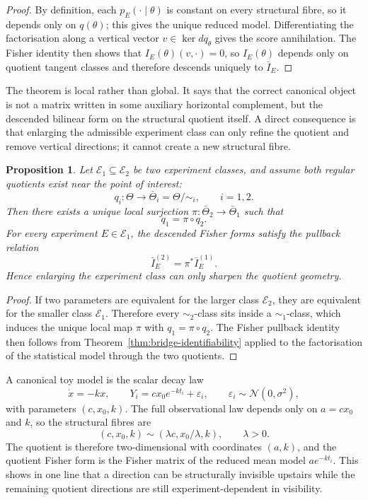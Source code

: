 \documentclass[11pt]{article}
\numberwithin{equation}{section}
\theoremstyle{thmcompact}
\newtheorem{proposition}[theorem]{Proposition}
\theoremstyle{remark}
\begin{document}
\begin{proof}
By definition, each $p_E(\cdot\mid\theta)$ is constant on every structural fibre, so it depends only on $q(\theta)$; this gives the unique reduced model. Differentiating the factorisation along a vertical vector $v\in\ker dq_\theta$ gives the score annihilation. The Fisher identity then shows that $I_E(\theta)(v,\cdot)=0$, so $I_E(\theta)$ depends only on quotient tangent classes and therefore descends uniquely to $\bar I_E$.
\end{proof}

The theorem is local rather than global. It says that the correct canonical object is not a matrix written in some auxiliary horizontal complement, but the descended bilinear form on the structural quotient itself. A direct consequence is that enlarging the admissible experiment class can only refine the quotient and remove vertical directions; it cannot create a new structural fibre.

\begin{proposition}\label{prop:bridge-identifiability-refinement}
Let $\mathcal E_1\subseteq \mathcal E_2$ be two experiment classes, and assume both regular quotients exist near the point of interest:
\[
q_i:\Theta\to \bar\Theta_i=\Theta/\!\sim_i,\qquad i=1,2.
\]
Then there exists a unique local surjection $\pi:\bar\Theta_2\to \bar\Theta_1$ such that
\[
q_1=\pi\circ q_2.
\]
For every experiment $E\in\mathcal E_1$, the descended Fisher forms satisfy the pullback relation
\[
\bar I_E^{(2)}=\pi^*\bar I_E^{(1)}.
\]
Hence enlarging the experiment class can only sharpen the quotient geometry.
\end{proposition}

\begin{proof}
If two parameters are equivalent for the larger class $\mathcal E_2$, they are equivalent for the smaller class $\mathcal E_1$. Therefore every $\sim_2$-class sits inside a $\sim_1$-class, which induces the unique local map $\pi$ with $q_1=\pi\circ q_2$. The Fisher pullback identity then follows from Theorem~\ref{thm:bridge-identifiability} applied to the factorisation of the statistical model through the two quotients.
\end{proof}

A canonical toy model is the scalar decay law
\[
\dot x=-k x,
\qquad
Y_i=c x_0 e^{-k t_i}+\varepsilon_i,
\qquad
\varepsilon_i\sim\mathcal N(0,\sigma^2),
\]
with parameters $(c,x_0,k)$. The full observational law depends only on $a=cx_0$ and $k$, so the structural fibres are
\[
(c,x_0,k)\sim(\lambda c,x_0/\lambda,k),\qquad \lambda>0.
\]
The quotient is therefore two-dimensional with coordinates $(a,k)$, and the quotient Fisher form is the Fisher matrix of the reduced mean model $a e^{-k t_i}$. This shows in one line that a direction can be structurally invisible upstairs while the remaining quotient directions are still experiment-dependent in visibility.
\end{document}
